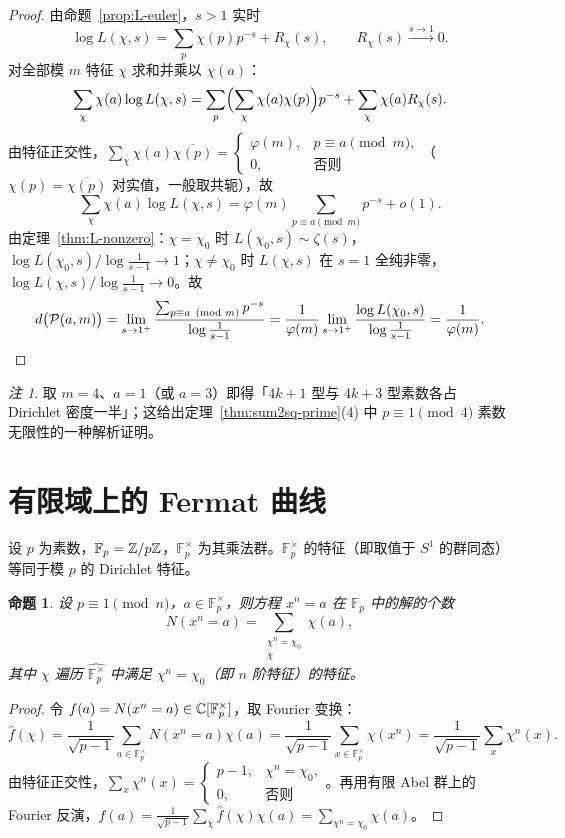 \documentclass{article}
\theoremstyle{plain}
\newtheorem{prop}[thm]{命题}
\theoremstyle{definition}
\theoremstyle{remark}
\newtheorem{rem}[thm]{注}
\begin{document}
\begin{proof}
  由命题~\ref{prop:L-euler}，$s>1$ 实时
  \[
    \log L(\chi,s)=\sum_p\chi(p)p^{-s}+R_\chi(s),\qquad R_\chi(s)\xrightarrow{s\to1}0.
  \]
  对全部模 $m$ 特征 $\chi$ 求和并乘以 $\chi(a)$：
  \[
    \sum_\chi\chi(a)\log L(\chi,s)=\sum_p\Bigl(\sum_\chi\chi(a)\chi(p)\Bigr)p^{-s}+\sum_\chi\chi(a)R_\chi(s).
  \]
  由特征正交性，$\sum_\chi\chi(a)\overline{\chi(p)}=
  \begin{cases}\varphi(m),& p\equiv a\pmod m,\\0,&\text{否则}
  \end{cases}$（$\chi(p)=\overline{\chi(p)}$ 对实值，一般取共轭），故
  \[
    \sum_\chi\chi(a)\log L(\chi,s)=\varphi(m)\sum_{p\equiv a\pmod m}p^{-s}+o(1).
  \]
  由定理~\ref{thm:L-nonzero}：$\chi=\chi_0$ 时 $L(\chi_0,s)\sim\zeta(s)$，$\log L(\chi_0,s)/\log\frac1{s-1}\to1$；$\chi\ne\chi_0$ 时 $L(\chi,s)$ 在 $s=1$ 全纯非零，$\log L(\chi,s)/\log\frac1{s-1}\to0$。故
  \[
    d\bigl(\mathcal P(a,m)\bigr)=\lim_{s\to1^+}\frac{\sum_{p\equiv a\pmod m}p^{-s}}{\log\frac1{s-1}}=\frac1{\varphi(m)}\lim_{s\to1^+}\frac{\log L(\chi_0,s)}{\log\frac1{s-1}}=\frac1{\varphi(m)}. \qedhere
  \]
\end{proof}

\begin{rem}
  取 $m=4$、$a=1$（或 $a=3$）即得「$4k+1$ 型与 $4k+3$ 型素数各占 Dirichlet 密度一半」；这给出定理~\ref{thm:sum2sq-prime}(4) 中 $p\equiv1\pmod4$ 素数无限性的一种解析证明。
\end{rem}

\section{有限域上的 Fermat 曲线}\label{sec:fermat-fp}

设 $p$ 为素数，$\mathbb{F}_p=\mathbb{Z}/p\mathbb{Z}$，$\mathbb{F}_p^\times$ 为其乘法群。$\mathbb{F}_p^\times$ 的特征（即取值于 $S^1$ 的群同态）等同于模 $p$ 的 Dirichlet 特征。

\begin{prop}\label{prop:count-xn}
  设 $p\equiv1\pmod n$，$a\in\mathbb{F}_p^\times$，则方程 $x^n=a$ 在 $\mathbb{F}_p$ 中的解的个数
  \[
    N(x^n=a)=\sum_{\substack{\chi^n=\chi_0\\\chi}}\chi(a),
  \]
  其中 $\chi$ 遍历 $\widehat{\mathbb{F}_p^\times}$ 中满足 $\chi^n=\chi_0$（即 $n$ 阶特征）的特征。
\end{prop}

\begin{proof}
  令 $f(a)=N(x^n=a)\in\mathbb{C}[\mathbb{F}_p^\times]$，取 Fourier 变换：
  \[
    \hat f(\chi)=\frac1{\sqrt{p-1}}\sum_{a\in\mathbb{F}_p^\times}N(x^n=a)\chi(a)=\frac1{\sqrt{p-1}}\sum_{x\in\mathbb{F}_p^\times}\chi(x^n)=\frac1{\sqrt{p-1}}\sum_x\chi^n(x).
  \]
  由特征正交性，$\sum_x\chi^n(x)=
  \begin{cases}p-1,&\chi^n=\chi_0,\\0,&\text{否则}
  \end{cases}$。再用有限 Abel 群上的 Fourier 反演，$f(a)=\frac1{\sqrt{p-1}}\sum_\chi\hat f(\chi)\chi(a)=\sum_{\chi^n=\chi_0}\chi(a)$。
\end{proof}
\end{document}
